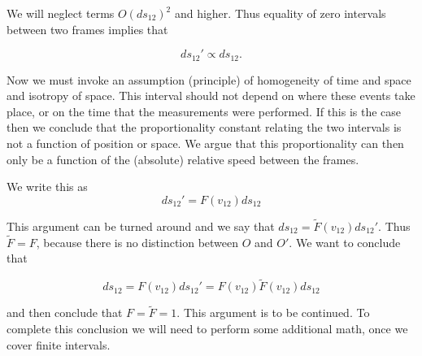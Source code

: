 We will neglect terms $O(ds_{12})^2$ and higher.  Thus equality of zero intervals between two frames implies that 

\begin{equation}\label{eqn:relativisticElectrodynamicsL1:80}
ds_{12}' \propto ds_{12}.
\end{equation}

Now we must invoke an assumption (principle) of homogeneity of time and space and isotropy of space.  This interval should not depend on where these events take place, or on the time that the measurements were performed.  If this is the case then we conclude that the proportionality constant relating the two intervals is not a function of position or space.  We argue that this proportionality can then only be a function of the (absolute) relative speed between the frames.

We write this as
\begin{equation}\label{eqn:relativisticElectrodynamicsL1:90}
ds_{12}' = F(v_{12}) ds_{12}
\end{equation}

This argument can be turned around and we say that $ds_{12} = \tilde{F}(v_{12}) ds_{12}'$.  Thus $\tilde{F} = F$, because there is no distinction between $O$ and $O'$.  We want to conclude that 

\begin{equation}\label{eqn:relativisticElectrodynamicsL1:100}
ds_{12} = F(v_{12}) ds_{12}' = F(v_{12}) \tilde{F}(v_{12}) ds_{12}
\end{equation}

and then conclude that $F = \tilde{F} = 1$.  This argument is to be continued.  To complete this conclusion we will need to perform some additional math, once we cover finite intervals.

%
%

\EndArticle
